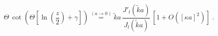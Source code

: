 \begin{equation}
\Theta
\,
 \cot 
\left(
\Theta
\left[
\ln \left( \frac{ z }{2} \right) 
+ \gamma
\right]
\right)
\stackrel{(a \rightarrow 0)}{=}
\tilde{k} a
\,
\frac{ J'_{l} ( \tilde{k} a )}{  J_{l} ( \tilde{k} a )}
\,
\left[ 1 + O \left( [\kappa a]^{2} \right)  \right] 
\;   .
\label{eq:eigenvalue_2D_ISP_circular_well_limit_a=0}
\end{equation}

